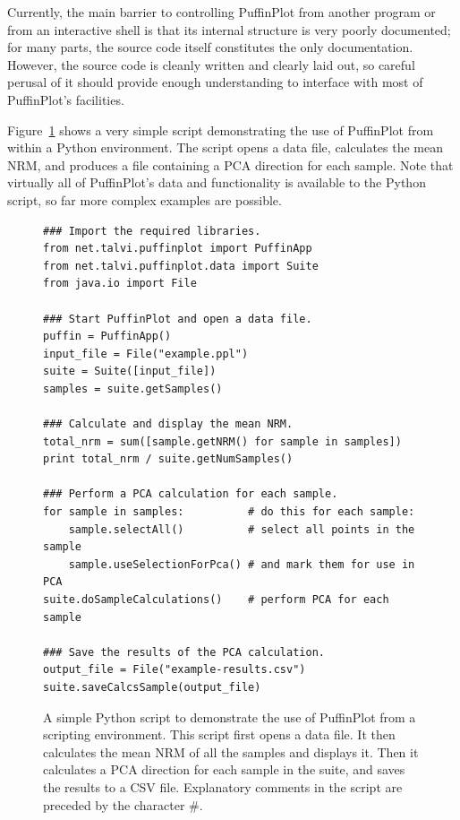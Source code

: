 \documentclass[a4paper,british]{article}
\newcommand{\caps}[1]{\MakeTextUppercase{#1}} %
\begin{document}
Currently, the main barrier to controlling PuffinPlot from another program or
from an interactive shell is that its internal structure is very poorly
documented; for many parts, the source code itself constitutes the only
documentation. However, the source code is cleanly written and clearly laid
out, so careful perusal of it should provide enough understanding to
interface with most of PuffinPlot's facilities.

Figure~\ref{fig:script-example} shows a very simple script
demonstrating the use of PuffinPlot from within a Python environment. The
script opens a data file, calculates the mean \caps{nrm}, and produces a file
containing a \caps{pca} direction for each sample. Note that virtually all of
PuffinPlot's data and functionality is available to the Python script, so far
more complex examples are possible.

\begin{figure}
  \caption{\label{fig:script-example}A simple Python script to
    demonstrate the use of PuffinPlot from a scripting environment. This
    script first opens a data file. It then calculates the mean \caps{nrm} of
    all the samples and displays it. Then it calculates a \caps{pca}
    direction for each sample in the suite, and saves the results to a
    \caps{csv} file. Explanatory comments in the script are preceded by the
    character \#.}
\lstset{language=Python}
\begin{lstlisting}
### Import the required libraries.
from net.talvi.puffinplot import PuffinApp
from net.talvi.puffinplot.data import Suite
from java.io import File

### Start PuffinPlot and open a data file.
puffin = PuffinApp()
input_file = File("example.ppl")
suite = Suite([input_file])
samples = suite.getSamples()

### Calculate and display the mean NRM.
total_nrm = sum([sample.getNRM() for sample in samples])
print total_nrm / suite.getNumSamples()

### Perform a PCA calculation for each sample.
for sample in samples:          # do this for each sample:
    sample.selectAll()          # select all points in the sample
    sample.useSelectionForPca() # and mark them for use in PCA
suite.doSampleCalculations()    # perform PCA for each sample

### Save the results of the PCA calculation.
output_file = File("example-results.csv")
suite.saveCalcsSample(output_file)
\end{lstlisting}
\end{figure}

\newpage


\end{document}
